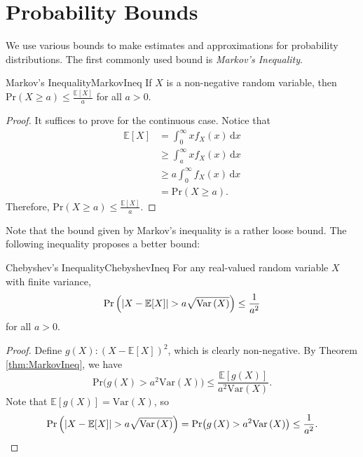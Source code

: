 \documentclass[math, code]{amznotes}
\theoremstyle{remark}
\renewcommand{\d}{\mathrm{d}}
\begin{document}
\section{Probability Bounds}
We use various bounds to make estimates and approximations for probability distributions. The first commonly used bound is \textit{Markov's Inequality}.
\begin{thmbox}{Markov's Inequality}{MarkovIneq}
    If $X$ is a non-negative random variable, then $\mathrm{Pr}\left(X \geq a\right) \leq \frac{\mathbb{E}[X]}{a}$ for all $a > 0$.
    \tcblower
    \begin{proof}
        It suffices to prove for the continuous case. Notice that 
        \begin{align*}
            \mathbb{E}[X] & = \int_{0}^{\infty}\!xf_X\left(x\right)\,\d x \\
            & \geq \int_{a}^{\infty}\!xf_X\left(x\right)\,\d x \\
            & \geq a\int_{0}^{\infty}\!f_X\left(x\right)\,\d x \\
            & = \mathrm{Pr}\left(X \geq a\right).
        \end{align*}
        Therefore, $\mathrm{Pr}\left(X \geq a\right) \leq \frac{\mathbb{E}[X]}{a}$.
    \end{proof}
\end{thmbox}
Note that the bound given by Markov's inequality is a rather loose bound. The following inequality proposes a better bound:
\begin{thmbox}{Chebyshev's Inequality}{ChebyshevIneq}
    For any real-valued random variable $X$ with finite variance, 
    \begin{equation*}
        \mathrm{Pr}\left({\left\lvert {X - \mathbb{E}[X]} \right\rvert} > a\sqrt{\mathrm{Var}\left(X\right)}\right) \leq \frac{1}{a^2}
    \end{equation*}
    for all $a > 0$.
    \tcblower
    \begin{proof}
        Define $g\left(X\right) \colon \left(X - \mathbb{E}[X]\right)^2$, which is clearly non-negative. By Theorem \ref{thm:MarkovIneq}, we have 
        \begin{equation*}
            \mathrm{Pr}\bigl(g\left(X\right) > a^2\mathrm{Var}\left(X\right)\bigr) \leq \frac{\mathbb{E}[g\left(X\right)]}{a^2\mathrm{Var}\left(X\right)}.
        \end{equation*}
        Note that $\mathbb{E}[g\left(X\right)] = \mathrm{Var}\left(X\right)$, so 
        \begin{equation*}
            \mathrm{Pr}\left({\left\lvert {X - \mathbb{E}[X]} \right\rvert} > a\sqrt{\mathrm{Var}\left(X\right)}\right) = \mathrm{Pr}\bigl(g\left(X\right) > a^2\mathrm{Var}\left(X\right)\bigr) \leq \frac{1}{a^2}.
        \end{equation*}
    \end{proof}
\end{thmbox}
\end{document}
